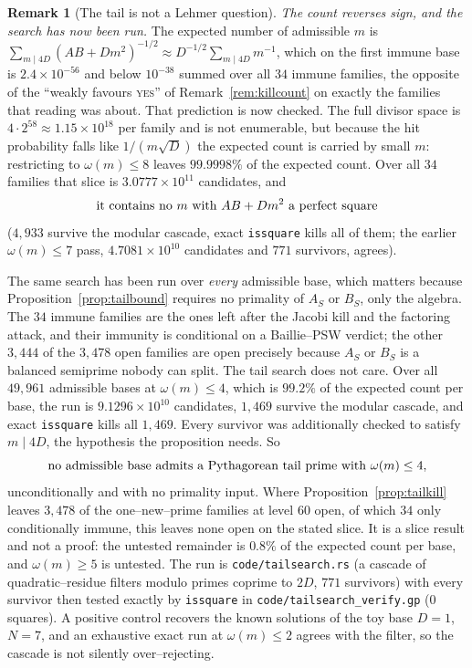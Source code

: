\documentclass[11pt]{article}
\theoremstyle{definition}
\newtheorem{remark}[theorem]{Remark}
\begin{document}
\begin{remark}[The tail is not a Lehmer question]
\emph{The count reverses sign, and the search has now been run.} The expected number of admissible
$m$ is $\sum_{m\mid 4D}(AB+Dm^2)^{-1/2}\approx D^{-1/2}\sum_{m\mid4D}m^{-1}$, which on the first
immune base is $2.4\times10^{-56}$ and below $10^{-38}$ summed over all $34$ immune families, the
opposite of the ``weakly favours \textsc{yes}'' of Remark~\ref{rem:killcount} on exactly the families
that reading was about. That prediction is now checked. The full divisor space is
$4\cdot2^{58}\approx1.15\times10^{18}$ per family and is not enumerable, but because the hit
probability falls like $1/(m\sqrt D)$ the expected count is carried by small $m$: restricting to
$\omega(m)\le8$ leaves $99.9998\%$ of the expected count. Over all $34$ families that slice is
$3.0777\times10^{11}$ candidates, and
\[ \textup{it contains no }m\textup{ with }AB+Dm^2\textup{ a perfect square} \]
($4{,}933$ survive the modular cascade, exact \texttt{issquare} kills all of them; the earlier
$\omega(m)\le7$ pass, $4.7081\times10^{10}$ candidates and $771$ survivors, agrees).

The same search has been run over \emph{every} admissible base, which matters because
Proposition~\ref{prop:tailbound} requires no primality of $A_S$ or $B_S$, only the algebra. The $34$
immune families are the ones left after the Jacobi kill and the factoring attack, and their immunity
is conditional on a Baillie--PSW verdict; the other $3{,}444$ of the $3{,}478$ open families are open
precisely because $A_S$ or $B_S$ is a balanced semiprime nobody can split. The tail search does not
care. Over all $49{,}961$ admissible bases at $\omega(m)\le4$, which is $99.2\%$ of the expected count
per base, the run is $9.1296\times10^{10}$ candidates, $1{,}469$ survive the modular cascade, and
exact \texttt{issquare} kills all $1{,}469$. Every survivor was additionally checked to satisfy
$m\mid 4D$, the hypothesis the proposition needs. So
\[ \textup{no admissible base admits a Pythagorean tail prime with }\omega(m)\le4, \]
unconditionally and with no primality input. Where Proposition~\ref{prop:tailkill} leaves $3{,}478$
of the one--new--prime families at level $60$ open, of which $34$ only conditionally immune, this
leaves none open on the stated slice. It is a slice result and not a proof: the untested remainder is
$0.8\%$ of the expected count per base, and $\omega(m)\ge5$ is untested.
The run is \texttt{code/tailsearch.rs} (a cascade of quadratic--residue filters modulo primes coprime
to $2D$, $771$ survivors) with every survivor then tested exactly by \texttt{issquare} in
\texttt{code/tailsearch\_verify.gp} ($0$ squares). A positive control recovers the known solutions of
the toy base $D=1$, $N=7$, and an exhaustive exact run at $\omega(m)\le2$ agrees with the filter, so
the cascade is not silently over--rejecting.


\end{remark}
\end{document}
